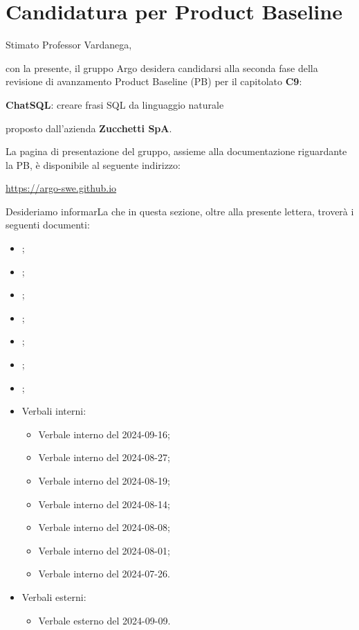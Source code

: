 





\makeFrontPage

\section*{Candidatura per Product Baseline}
\par Stimato Professor Vardanega, \newline

con la presente, il gruppo Argo desidera candidarsi alla seconda fase della revisione di avanzamento Product Baseline (PB) per il capitolato \textbf{C9}: \newline

\quad \textbf{ChatSQL}: creare frasi SQL da linguaggio naturale \newline

proposto dall'azienda \textbf{Zucchetti SpA}. \newline

\par La pagina di presentazione del gruppo, assieme alla documentazione riguardante la PB, è disponibile al seguente indirizzo: \newline

\quad \href{https://argo-swe.github.io}{https://argo-swe.github.io} \newline

\par Desideriamo informarLa che in questa sezione, oltre alla presente lettera, troverà i seguenti documenti:
\begin{itemize}
    \item \AnalisiDeiRequisiti;
    \item \Glossario;
    \item \NormeDiProgetto;
    \item \PianoDiProgetto;
    \item \PianoDiQualifica; 
    \item \SpecificaTecnica;
    \item \ManualeUtente;
    \item Verbali interni: 
        \begin{itemize}
            \item Verbale interno del 2024-09-16;
            \item Verbale interno del 2024-08-27;
            \item Verbale interno del 2024-08-19;
            \item Verbale interno del 2024-08-14;
            \item Verbale interno del 2024-08-08;
            \item Verbale interno del 2024-08-01;
            \item Verbale interno del 2024-07-26.
        \end{itemize}
    \item Verbali esterni:
    \begin{itemize}
        \item Verbale esterno del 2024-09-09.
    \end{itemize}
\end{itemize}


